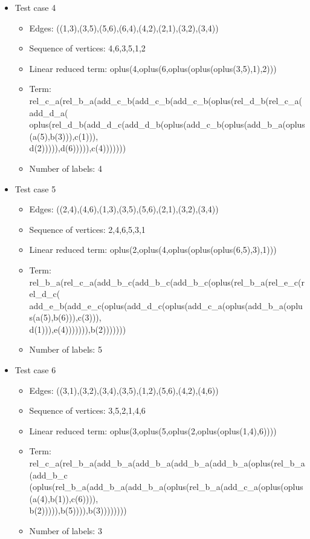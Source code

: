 \documentclass[a4paper, 12pt]{article}
\begin{document}
\begin{itemize}
\item Test case 4
	\begin{itemize}
		\item Edges: ((1,3),(3,5),(5,6),(6,4),(4,2),(2,1),(3,2),(3,4))
		\item Sequence of vertices: 4,6,3,5,1,2
		\item Linear reduced term: oplus(4,oplus(6,oplus(oplus(oplus(3,5),1),2)))
		\item Term: rel\_c\_a(rel\_b\_a(add\_c\_b(add\_c\_b(add\_c\_b(oplus(rel\_d\_b(rel\_c\_a(add\_d\_a( \\ 
oplus(rel\_d\_b(add\_d\_c(add\_d\_b(oplus(add\_c\_b(oplus(add\_b\_a(oplus(a(5),b(3))),c(1))), \\
d(2))))),d(6))))),c(4)))))))
		\item Number of labels: 4
	\end{itemize}

\item Test case 5
	\begin{itemize}
		\item Edges: ((2,4),(4,6),(1,3),(3,5),(5,6),(2,1),(3,2),(3,4))
		\item Sequence of vertices: 2,4,6,5,3,1
		\item Linear reduced term: oplus(2,oplus(4,oplus(oplus(oplus(6,5),3),1)))
		\item Term: rel\_b\_a(rel\_c\_a(add\_b\_c(add\_b\_c(add\_b\_c(oplus(rel\_b\_a(rel\_e\_c(rel\_d\_c( \\
add\_e\_b(add\_e\_c(oplus(add\_d\_c(oplus(add\_c\_a(oplus(add\_b\_a(oplus(a(5),b(6))),c(3))), \\
d(1))),e(4))))))),b(2)))))))
		\item Number of labels: 5
	\end{itemize}

\item Test case 6
	\begin{itemize}
		\item Edges: ((3,1),(3,2),(3,4),(3,5),(1,2),(5,6),(4,2),(4,6))		
		\item Sequence of vertices: 3,5,2,1,4,6
		\item Linear reduced term: oplus(3,oplus(5,oplus(2,oplus(oplus(1,4),6))))
		\item Term: rel\_c\_a(rel\_b\_a(add\_b\_a(add\_b\_a(add\_b\_a(add\_b\_a(oplus(rel\_b\_a(add\_b\_c \\ 
(oplus(rel\_b\_a(add\_b\_a(add\_b\_a(oplus(rel\_b\_a(add\_c\_a(oplus(oplus(a(4),b(1)),c(6)))), \\
b(2))))),b(5)))),b(3))))))))
		\item Number of labels: 3
	\end{itemize}


\end{itemize}
\end{document}
